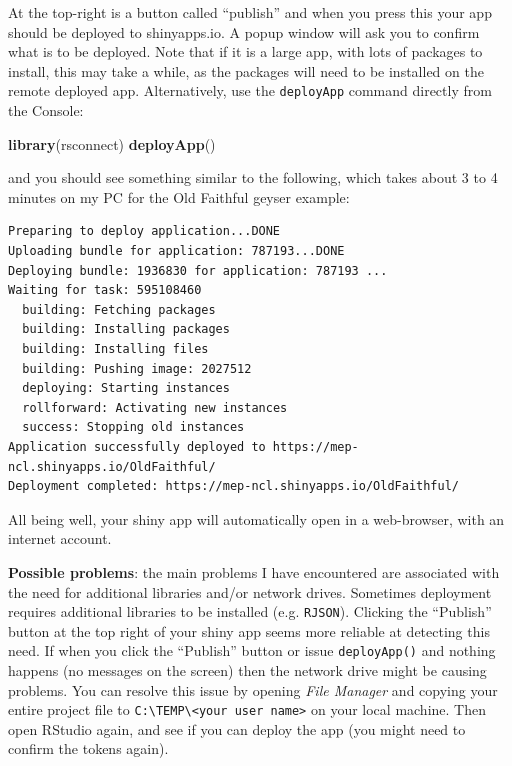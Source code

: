 \documentclass[]{article}
\newenvironment{Shaded}{\begin{snugshade}}{\end{snugshade}}
\newcommand{\KeywordTok}[1]{\textcolor[rgb]{0.13,0.29,0.53}{\textbf{#1}}}
\newcommand{\NormalTok}[1]{#1}
\begin{document}
At the top-right is a button called ``publish'' and when you press this
your app should be deployed to shinyapps.io. A popup window will ask you
to confirm what is to be deployed. Note that if it is a large app, with
lots of packages to install, this may take a while, as the packages will
need to be installed on the remote deployed app. Alternatively, use the
\texttt{deployApp} command directly from the Console:

\begin{Shaded}
\begin{Highlighting}[]
\KeywordTok{library}\NormalTok{(rsconnect)}
\KeywordTok{deployApp}\NormalTok{()}
\end{Highlighting}
\end{Shaded}

and you should see something similar to the following, which takes about
3 to 4 minutes on my PC for the Old Faithful geyser example:

\begin{verbatim}
Preparing to deploy application...DONE
Uploading bundle for application: 787193...DONE
Deploying bundle: 1936830 for application: 787193 ...
Waiting for task: 595108460
  building: Fetching packages
  building: Installing packages
  building: Installing files
  building: Pushing image: 2027512
  deploying: Starting instances
  rollforward: Activating new instances
  success: Stopping old instances
Application successfully deployed to https://mep-ncl.shinyapps.io/OldFaithful/
Deployment completed: https://mep-ncl.shinyapps.io/OldFaithful/
\end{verbatim}

All being well, your shiny app will automatically open in a web-browser,
with an internet account.

\textbf{Possible problems}: the main problems I have encountered are
associated with the need for additional libraries and/or network drives.
Sometimes deployment requires additional libraries to be installed (e.g.
\texttt{RJSON}). Clicking the ``Publish'' button at the top right of
your shiny app seems more reliable at detecting this need. If when you
click the ``Publish'' button or issue \texttt{deployApp()} and nothing
happens (no messages on the screen) then the network drive might be
causing problems. You can resolve this issue by opening \emph{File
Manager} and copying your entire project file to
\texttt{C:\textbackslash{}TEMP\textbackslash{}\textless{}your\ user\ name\textgreater{}}
on your local machine. Then open RStudio again, and see if you can
deploy the app (you might need to confirm the tokens again).
\end{document}

